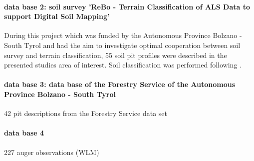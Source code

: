 \documentclass[preprint,12pt,authoryear]{elsarticle}
\begin{document}
\paragraph{data base 2: soil survey 'ReBo - Terrain Classification
of ALS Data to support Digital Soil Mapping'} 
During this project which was  funded by the Autonomous
Province Bolzano - South Tyrol and had the aim to investigate optimal cooperation between soil survey and terrain classification, 55 soil pit profiles were described in the presented studies area of interest. Soil classification was performed following \cite{kilian2015}.

\paragraph{data base 3: data base of the Forestry Service of the Autonomous
Province Bolzano - South Tyrol} 

42 pit descriptions from the Forestry Service data set

\paragraph{data base 4} 

227 auger observations (WLM)
\end{document}
